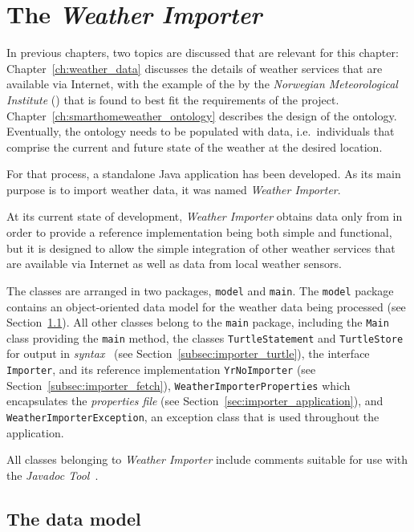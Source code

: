 \chapter{The \emph{Weather Importer}}
\label{ch:weather_importer}

In previous chapters, two topics are discussed that are relevant for this chapter: Chapter~\ref{ch:weather_data} discusses the details of weather services that are available via Internet, with the example of the  by the \emph{Norwegian Meteorological Institute} (\yrno) that is found to best fit the requirements of the \smarthomeweather project. Chapter~\ref{ch:smarthomeweather_ontology} describes the design of the \smarthomeweather ontology. Eventually, the ontology needs to be populated with data, i.e.\ individuals that comprise the current and future state of the weather at the desired location.

For that process, a standalone Java application has been developed. As its main purpose is to import weather data, it was named \emph{Weather Importer}.

At its current state of development, \emph{Weather Importer} obtains data only from \yrno in order to provide a reference implementation being both simple and functional, but it is designed to allow the simple integration of other weather services that are available via Internet as well as data from local weather sensors.

The classes are arranged in two packages, \texttt{model} and \texttt{main}. The \texttt{model} package contains an object-oriented data model for the weather data being processed (see Section~\ref{sec:importer_model}). All other classes belong to the \texttt{main} package, including the \texttt{Main} class providing the \texttt{main} method, the classes \texttt{TurtleStatement} and \texttt{TurtleStore} for output in \emph{ syntax}~\cite{Turtle} (see Section~\ref{subsec:importer_turtle}), the interface \texttt{Importer}, and its reference implementation \texttt{YrNoImporter} (see Section~\ref{subsec:importer_fetch}), \texttt{WeatherImporterProperties} which encapsulates the \emph{properties file} (see Section~\ref{sec:importer_application}), and \texttt{WeatherImporterException}, an exception class that is used throughout the application.

All classes belonging to \emph{Weather Importer} include comments suitable for use with the \emph{Javadoc Tool}~\cite{javadoc}.

\section{The data model}
\label{sec:importer_model}

